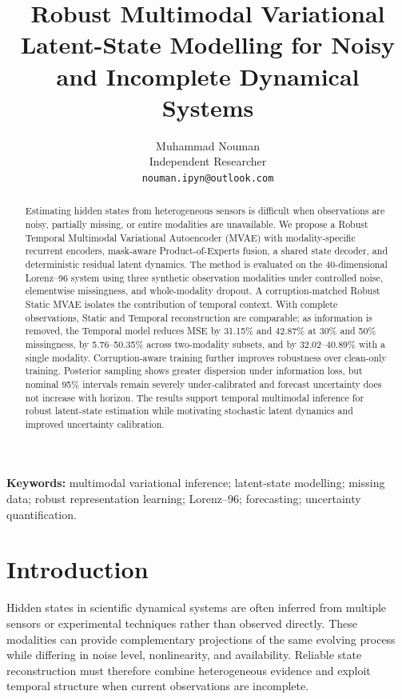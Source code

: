 \documentclass[10pt,twocolumn]{article}
\title{Robust Multimodal Variational Latent-State Modelling for Noisy and Incomplete Dynamical Systems}
\author{Muhammad Nouman\\\small Independent Researcher\\\small \texttt{nouman.ipyn@outlook.com}}
\date{}
\begin{document}
\maketitle

\begin{abstract}
Estimating hidden states from heterogeneous sensors is difficult when observations are noisy, partially missing, or entire modalities are unavailable. We propose a Robust Temporal Multimodal Variational Autoencoder (MVAE) with modality-specific recurrent encoders, mask-aware Product-of-Experts fusion, a shared state decoder, and deterministic residual latent dynamics. The method is evaluated on the 40-dimensional Lorenz--96 system using three synthetic observation modalities under controlled noise, elementwise missingness, and whole-modality dropout. A corruption-matched Robust Static MVAE isolates the contribution of temporal context. With complete observations, Static and Temporal reconstruction are comparable; as information is removed, the Temporal model reduces MSE by 31.15\% and 42.87\% at 30\% and 50\% missingness, by 5.76--50.35\% across two-modality subsets, and by 32.02--40.89\% with a single modality. Corruption-aware training further improves robustness over clean-only training. Posterior sampling shows greater dispersion under information loss, but nominal 95\% intervals remain severely under-calibrated and forecast uncertainty does not increase with horizon. The results support temporal multimodal inference for robust latent-state estimation while motivating stochastic latent dynamics and improved uncertainty calibration.
\end{abstract}


\noindent\textbf{Keywords:} multimodal variational inference; latent-state modelling; missing data; robust representation learning; Lorenz–96; forecasting; uncertainty quantification.

\section{Introduction}
Hidden states in scientific dynamical systems are often inferred from multiple sensors or experimental techniques rather than observed directly. These modalities can provide complementary projections of the same evolving process while differing in noise level, nonlinearity, and availability. Reliable state reconstruction must therefore combine heterogeneous evidence and exploit temporal structure when current observations are incomplete.
\end{document}
